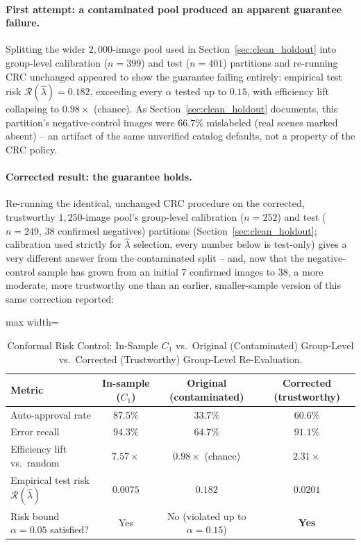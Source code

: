 \documentclass[12pt,a4paper]{report}
\begin{document}
\paragraph{First attempt: a contaminated pool produced an apparent guarantee failure.} Splitting the wider $2{,}000$-image pool used in Section~\ref{sec:clean_holdout} into group-level calibration ($n=399$) and test ($n=401$) partitions and re-running CRC unchanged appeared to show the guarantee failing entirely: empirical test risk $\mathcal{R}(\hat\lambda)=0.182$, exceeding every $\alpha$ tested up to $0.15$, with efficiency lift collapsing to $0.98\times$ (chance). As Section~\ref{sec:clean_holdout} documents, this partition's negative-control images were $66.7\%$ mislabeled (real scenes marked absent) -- an artifact of the same unverified catalog defaults, not a property of the CRC policy.

\paragraph{Corrected result: the guarantee holds.} Re-running the identical, unchanged CRC procedure on the corrected, trustworthy $1{,}250$-image pool's group-level calibration ($n=252$) and test ($n=249$, $38$ confirmed negatives) partitions (Section~\ref{sec:clean_holdout}; calibration used strictly for $\hat\lambda$ selection, every number below is test-only) gives a very different answer from the contaminated split -- and, now that the negative-control sample has grown from an initial $7$ confirmed images to $38$, a more moderate, more trustworthy one than an earlier, smaller-sample version of this same correction reported:

\begin{table}[!htbp]
\centering
\caption{Conformal Risk Control: In-Sample $C_1$ vs.\ Original (Contaminated) Group-Level vs.\ Corrected (Trustworthy) Group-Level Re-Evaluation.}
\label{tab:crc_clean_vs_leaky}
\begin{adjustbox}{max width=\linewidth}
\begin{tabular}{lccc}
\toprule
\textbf{Metric} & \textbf{In-sample ($C_1$)} & \textbf{Original (contaminated)} & \textbf{Corrected (trustworthy)} \\
\midrule
Auto-approval rate & $87.5\%$ & $33.7\%$ & $60.6\%$ \\
Error recall & $94.3\%$ & $64.7\%$ & $91.1\%$ \\
Efficiency lift vs.\ random & $7.57\times$ & $0.98\times$ (chance) & $\mathbf{2.31\times}$ \\
Empirical test risk $\mathcal{R}(\hat\lambda)$ & $0.0075$ & $0.182$ & $\mathbf{0.0201}$ \\
Risk bound $\alpha=0.05$ satisfied? & Yes & No (violated up to $\alpha=0.15$) & \textbf{Yes} \\
\bottomrule
\end{tabular}
\end{adjustbox}
\end{table}
\end{document}
